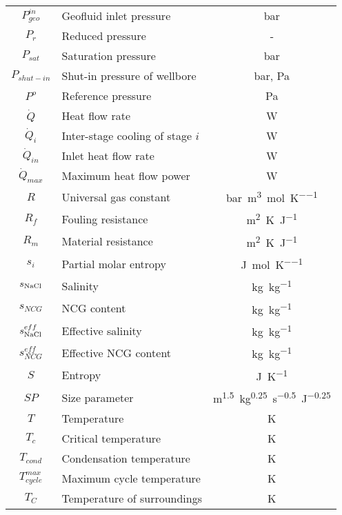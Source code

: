\begin{longtable}{  c|p{10cm}|c}
        $P_{geo}^{in}$ & Geofluid inlet pressure & \unit{\bar} \\[2px]
        $P_{r}$ & Reduced pressure & - \\[2px]
        $P_{sat}$ & Saturation pressure & \unit{\bar} \\[2px]
        $P_{shut-in}$ & Shut-in pressure of wellbore & \unit{\bar}, \unit{\Pa} \\[2px]
        $P^o$ & Reference pressure & \unit{\Pa} \\[2px]
        $\Dot{Q}$ & Heat flow rate & \unit{\watt} \\[2px]
        $\Dot{Q}_{i}$ & Inter-stage cooling of stage \(i\) & \unit{\watt} \\[2px]
        $\Dot{Q}_{in}$ & Inlet heat flow rate & \unit{\watt} \\[2px]
        $\Dot{Q}_{max}$ & Maximum heat flow power & \unit{\watt} \\[2px]
        $R$ & Universal gas constant & \unit{\bar\cubic\m\per\mol\per\K} \\[2px]
        $R_f$ & Fouling resistance & \unit{\m\squared\K\per\joule} \\[2px]
        $R_m$ & Material resistance & \unit{\m\squared\K\per\joule} \\[2px]
        $s_i$ & Partial molar entropy & \unit{\joule\per\mol\per\K} \\[2px]
        $s_{\ce{NaCl}}$ & Salinity & \unit{\kg\per\kg} \\[2px]
        $s_{NCG}$ & \ac{NCG} content & \unit{\kg\per\kg} \\[2px]
        $s_{\ce{NaCl}}^{eff}$ & Effective salinity & \unit{\kg\per\kg} \\[2px]
        $s_{NCG}^{eff}$ & Effective \ac{NCG} content & \unit{\kg\per\kg} \\[2px]
        $S$ & Entropy & \unit{\joule\per\K} \\[2px]
        $SP$ & Size parameter & \unit{m^{1.5}.kg^{0.25}.s^{-0.5}.J^{-0.25}} \\[2px]
        $T$ & Temperature & \unit{\K} \\[2px]
        $T_c$ & Critical temperature & \unit{\K} \\[2px]
        $T_{cond}$ & Condensation temperature & \unit{\K} \\[2px]
        $T_{cycle}^{max}$ & Maximum cycle temperature & \unit{\K} \\[2px]
        $T_C$ & Temperature of surroundings & \unit{\K} \\[2px]

\end{longtable}
